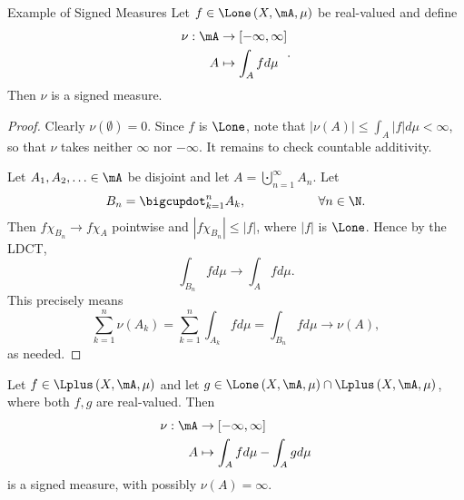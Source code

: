 \documentclass[pmath451]{subfiles}
\begin{document}
    \begin{prop}{Example of Signed Measures}
        Let $f\in\Lone\left( X,\mA,\mu \right)$ be real-valued and define
        \begin{equation*}
            \begin{aligned}
                \nu:\mA&\to\left[ -\infty,\infty \right] \\ 
                A&\mapsto\int_Afd\mu
            \end{aligned} .
        \end{equation*}
        Then $\nu$ is a signed measure.
    \end{prop}

    \begin{proof}
        Clearly $\nu\left( \emptyset \right) = 0$. Since $f$ is $\Lone$, note that $\left| \nu\left( A \right) \right| \leq \int_A\left| f \right|d\mu < \infty$, so that $\nu$ takes neither $\infty$ nor $-\infty$. It remains to check countable additivity.

        Let $A_1,A_2,\ldots\in\mA$ be disjoint and let $A=\bigcupdot^{\infty}_{n=1}A_n$. Let
        \begin{equation*}
            B_n = \bigcupdot^{n}_{k=1} A_k, \hspace{2cm}\forall n\in\N.
        \end{equation*}
        Then $f\chi_{B_n}\to f\chi_{A}$ pointwise and $\left| f\chi_{B_n} \right|\leq\left| f \right|$, where $\left| f \right|$ is $\Lone$. Hence by the LDCT,
        \begin{equation*}
            \int_{B_n}fd\mu \to \int_Afd\mu.
        \end{equation*}
        This precisely means
        \begin{equation*}
            \sum^{n}_{k=1}\nu\left( A_k \right) = \sum^{n}_{k=1} \int_{A_k}fd\mu = \int_{B_n}fd\mu \to \nu\left( A \right),
        \end{equation*}
        as needed.
    \end{proof}

    \clearpage
    
    \begin{example}{}
        Let $f\in\Lplus\left( X,\mA,\mu \right)$ and let $g\in\Lone\left( X,\mA,\mu \right)\cap\Lplus\left( X,\mA,\mu \right)$, where both $f,g$ are real-valued. Then
        \begin{equation*}
            \begin{aligned}
                \nu:\mA&\to\left[ -\infty,\infty \right] \\ 
                A&\mapsto \int_Afd\mu-\int_Agd\mu
            \end{aligned} 
        \end{equation*}
        is a signed measure, with possibly $\nu\left( A \right)=\infty$.
    \end{example}
    
\end{document}
